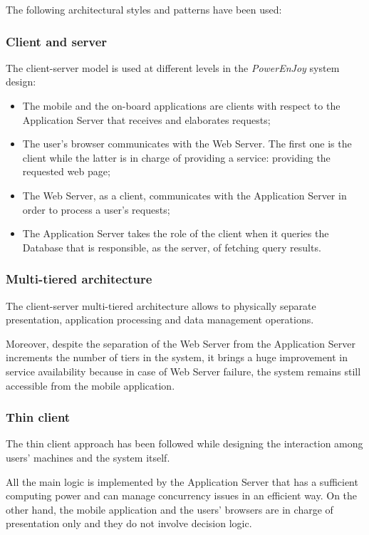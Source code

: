 The following architectural styles and patterns have been used:

\subsubsection{Client and server}
The client-server model is used at different levels in the \emph{PowerEnJoy} system design:
\begin{itemize}
\item The mobile and the on-board applications are clients with respect to the Application Server that receives and elaborates requests;
\item The user's browser communicates with the Web Server. The first one is the client while the latter is in charge of providing a service: providing the requested web page;
\item The Web Server, as a client, communicates with the Application Server in order to process a user's requests;
\item The Application Server takes the role of the client when it queries the Database that is responsible, as the server, of fetching query results.
\end{itemize}

\subsubsection{Multi-tiered architecture}
The client-server multi-tiered architecture allows to physically separate presentation, application processing and data management operations.

Moreover, despite the separation of the Web Server from the Application Server increments the number of tiers in the system, it brings a huge improvement in service availability because in case of Web Server failure, the system remains still accessible from the mobile application.

\subsubsection{Thin client}
The thin client approach has been followed while designing the interaction among users' machines and the system itself.

All the main logic is implemented by the Application Server that has a sufficient computing power and can manage concurrency issues in an efficient way. On the other hand, the mobile application and the users' browsers are in charge of presentation only and they do not involve decision logic.

